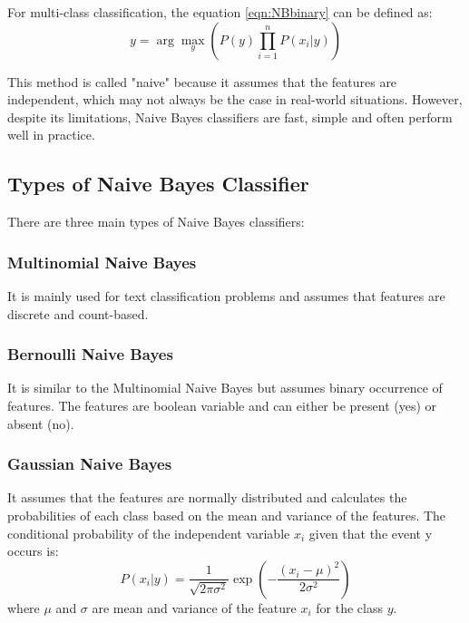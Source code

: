 For multi-class classification, the equation \ref{eqn:NBbinary} can be defined as:
\begin{equation}\label{eqn:NBbinary}
  y = \arg\max_y \left(P(y) \prod_{i=1}^n P(x_i|y)\right)
\end{equation}

This method is called "naive" because it assumes that the features are independent, which may not always be the case in real-world situations. However, despite its limitations, Naive Bayes classifiers are fast, simple and often perform well in practice.

\newpage
\subsection{Types of Naive Bayes Classifier}

There are three main types of Naive Bayes classifiers:

\subsubsection{\textbf{Multinomial Naive Bayes}}
It is mainly used for text classification problems and assumes that features are discrete and count-based.

\subsubsection{\textbf{Bernoulli Naive Bayes}}
It is similar to the Multinomial Naive Bayes but assumes binary occurrence of features. The features are boolean variable and can either be present (yes) or absent (no).

\subsubsection{\textbf{Gaussian Naive Bayes}}
It assumes that the features are normally distributed and calculates the probabilities of each class based on the mean and variance of the features. The conditional probability of the independent variable $x_i$ given that the event y occurs is:
\begin{equation}\label{eqn:NBGauss}
  P(x_i|y) = \frac{1}{\sqrt{2\pi\sigma^2}}\exp\left(-\frac{(x_i - \mu)^2}{2\sigma^2}\right)
\end{equation} where $\mu$ and $\sigma$ are mean and variance of the feature $x_i$ for the class $y$.


